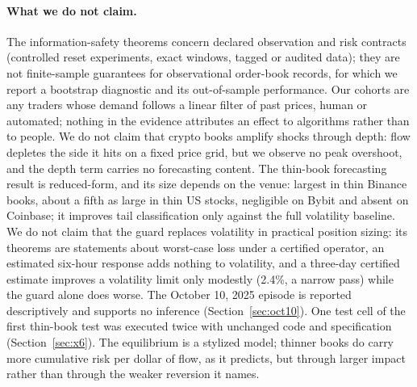 \documentclass[12pt]{article}
\theoremstyle{definition}
\theoremstyle{remark}
\begin{document}
\paragraph{What we do not claim.} The information-safety theorems concern declared observation and risk contracts (controlled reset experiments, exact windows, tagged or audited data); they are not finite-sample guarantees for observational order-book records, for which we report a bootstrap diagnostic and its out-of-sample performance. Our cohorts are any traders whose demand follows a linear filter of past prices, human or automated; nothing in the evidence attributes an effect to algorithms rather than to people. We do not claim that crypto books amplify shocks through depth: flow depletes the side it hits on a fixed price grid, but we observe no peak overshoot, and the depth term carries no forecasting content. The thin-book forecasting result is reduced-form, and its size depends on the venue: largest in thin Binance books, about a fifth as large in thin US stocks, negligible on Bybit and absent on Coinbase; it improves tail classification only against the full volatility baseline. We do not claim that the guard replaces volatility in practical position sizing: its theorems are statements about worst-case loss under a certified operator, an estimated six-hour response adds nothing to volatility, and a three-day certified estimate improves a volatility limit only modestly (2.4\%, a narrow pass) while the guard alone does worse. The October 10, 2025 episode is reported descriptively and supports no inference (Section~\ref{sec:oct10}). One test cell of the first thin-book test was executed twice with unchanged code and specification (Section~\ref{sec:x6}). The equilibrium is a stylized model; thinner books do carry more cumulative risk per dollar of flow, as it predicts, but through larger impact rather than through the weaker reversion it names.
\end{document}
